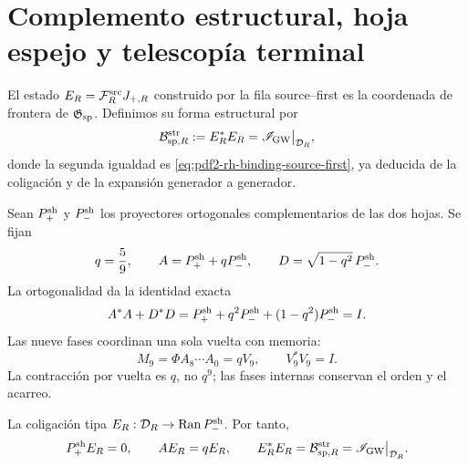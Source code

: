 \section{Complemento estructural, hoja espejo y telescopía terminal}

El estado \(E_R=\mathcal F_R^{\rm src}J_{+,R}\) construido por la fila
source--first es la coordenada de frontera de
\(\mathfrak G_{\rm sp}\). Definimos su forma estructural por
\begin{equation}\label{eq:pdf2-rh-bw-estructural}
 \mathcal B_{{\rm sp},R}^{\rm str}
 :=E_R^*E_R
 =\mathscr I_{\rm GW}\big|_{\mathcal D_R},
\end{equation}
donde la segunda igualdad es
\eqref{eq:pdf2-rh-binding-source-first}, ya deducida de la coligación y de
la expansión generador a generador.

Sean \(P_+^{\rm sh}\) y \(P_-^{\rm sh}\) los proyectores ortogonales
complementarios de las dos hojas. Se fijan
\begin{equation}\label{eq:pdf2-rh-q-a-d}
 q=\frac59,\qquad
 A=P_+^{\rm sh}+qP_-^{\rm sh},\qquad
 D=\sqrt{1-q^2}\,P_-^{\rm sh}.
\end{equation}
La ortogonalidad da la identidad exacta
\begin{equation}\label{eq:pdf2-rh-conservacion-local}
 A^*A+D^*D
 =P_+^{\rm sh}+q^2P_-^{\rm sh}
 +(1-q^2)P_-^{\rm sh}=I.
\end{equation}
Las nueve fases coordinan una sola vuelta con memoria:
\begin{equation}\label{eq:pdf2-rh-monodromia}
 M_9=\Phi A_8\cdots A_0=qV_9,
 \qquad V_9^*V_9=I.
\end{equation}
La contracción por vuelta es \(q\), no \(q^9\); las fases internas conservan
el orden y el acarreo.

La coligación tipa
\(E_R:\mathcal D_R\to\operatorname{Ran}P_-^{\rm sh}\). Por tanto,
\begin{equation}\label{eq:pdf2-rh-binding-espejo}
 P_+^{\rm sh}E_R=0,
 \qquad AE_R=qE_R,
 \qquad
 E_R^*E_R=\mathcal B_{{\rm sp},R}^{\rm str}
 =\mathscr I_{\rm GW}\big|_{\mathcal D_R}.
\end{equation}

